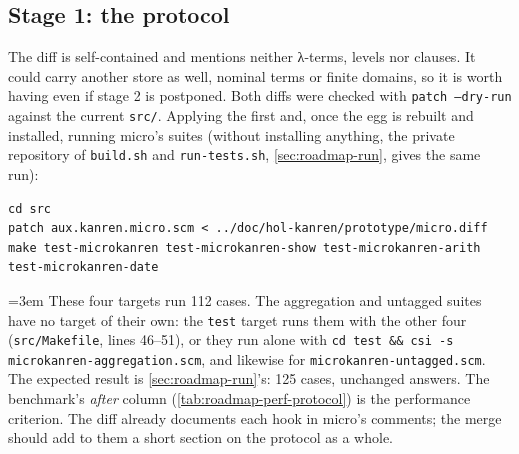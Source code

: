 \subsection{Stage 1: the protocol}\label{sec:roadmap-stage1}

The diff is self-contained and mentions neither λ-terms, levels nor clauses. It could carry another
store as well, nominal terms or finite domains, so it is worth having even if stage 2 is postponed.
Both diffs were checked with \texttt{patch --dry-run} against the current \texttt{src/}. Applying the first
and, once the egg is rebuilt and installed, running micro's suites (without installing anything, the
private repository of \texttt{build.sh} and \texttt{run-tests.sh}, \cref{sec:roadmap-run}, gives the
same run):
\begin{Verbatim}[xrightmargin=-\overhang]
cd src
patch aux.kanren.micro.scm < ../doc/hol-kanren/prototype/micro.diff
make test-microkanren test-microkanren-show test-microkanren-arith test-microkanren-date
\end{Verbatim}
{\emergencystretch=3em
These four targets run 112 cases. The aggregation and untagged suites have no target of their own: the
\texttt{test} target runs them with the other four (\texttt{src/Makefile}, lines 46--51), or they run alone
with \texttt{cd test \&\& csi -s microkanren-aggregation.scm}, and likewise for
\texttt{microkanren-untagged.scm}. The expected result is \cref{sec:roadmap-run}'s: 125 cases, unchanged answers. The benchmark's
\emph{after} column (\cref{tab:roadmap-perf-protocol}) is the performance criterion. The diff already
documents each hook in micro's comments; the merge should add to them a short section on the protocol as
a whole.\par}

